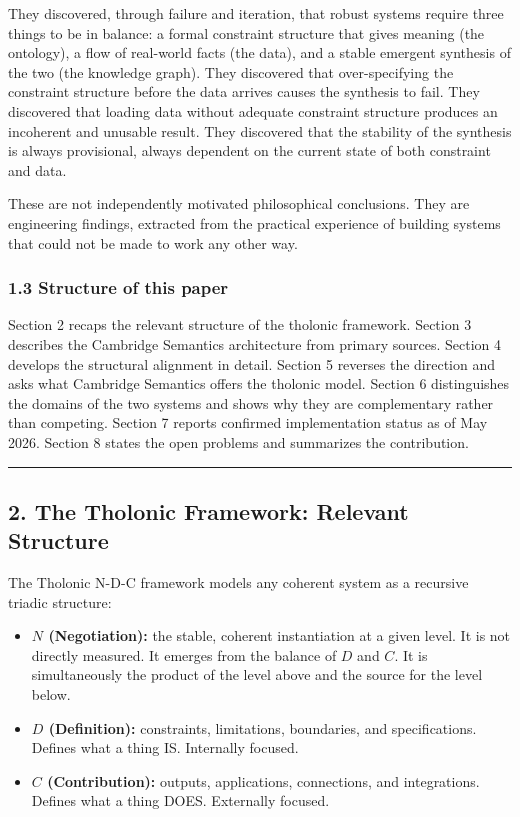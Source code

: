 \documentclass[
  11pt,
  letterpaper,
]{article}
\providecommand{\tightlist}{%
  \setlength{\itemsep}{0pt}\setlength{\parskip}{0pt}}
\begin{document}
They discovered, through failure and iteration, that robust systems
require three things to be in balance: a formal constraint structure
that gives meaning (the ontology), a flow of real-world facts (the
data), and a stable emergent synthesis of the two (the knowledge graph).
They discovered that over-specifying the constraint structure before the
data arrives causes the synthesis to fail. They discovered that loading
data without adequate constraint structure produces an incoherent and
unusable result. They discovered that the stability of the synthesis is
always provisional, always dependent on the current state of both
constraint and data.

These are not independently motivated philosophical conclusions. They
are engineering findings, extracted from the practical experience of
building systems that could not be made to work any other way.

\subsubsection{1.3 Structure of this
paper}\label{structure-of-this-paper}

Section 2 recaps the relevant structure of the tholonic framework.
Section 3 describes the Cambridge Semantics architecture from primary
sources. Section 4 develops the structural alignment in detail. Section
5 reverses the direction and asks what Cambridge Semantics offers the
tholonic model. Section 6 distinguishes the domains of the two systems
and shows why they are complementary rather than competing. Section 7
reports confirmed implementation status as of May 2026. Section 8 states
the open problems and summarizes the contribution.

\begin{center}\rule{0.5\linewidth}{0.5pt}\end{center}

\subsection{2. The Tholonic Framework: Relevant
Structure}\label{the-tholonic-framework-relevant-structure}

The Tholonic N-D-C framework models any coherent system as a recursive
triadic structure:

\begin{itemize}
\tightlist
\item
  \textbf{\(N\) (Negotiation):} the stable, coherent instantiation at a
  given level. It is not directly measured. It emerges from the balance
  of \(D\) and \(C\). It is simultaneously the product of the level
  above and the source for the level below.
\item
  \textbf{\(D\) (Definition):} constraints, limitations, boundaries, and
  specifications. Defines what a thing IS. Internally focused.
\item
  \textbf{\(C\) (Contribution):} outputs, applications, connections, and
  integrations. Defines what a thing DOES. Externally focused.
\end{itemize}
\end{document}
